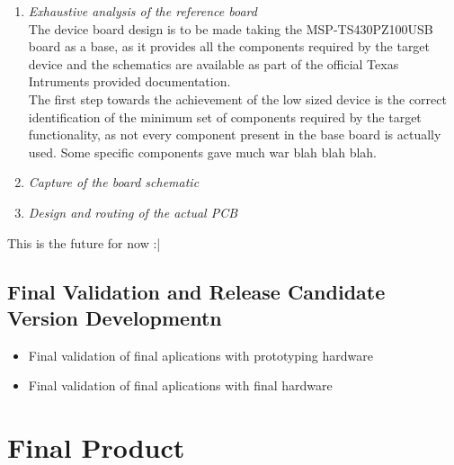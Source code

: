 		\begin{enumerate}
		\item \emph{Exhaustive analysis of the reference board}\\

			The device board design is to be made taking the MSP-TS430PZ100USB board as a base, as it provides all the components required by the target device and the schematics are available as part of the official Texas Intruments provided documentation.\\

			The first step towards the achievement of the low sized device is the correct identification of the minimum set of components required by the target functionality, as not every component present in the base board is actually used. Some specific components gave much war blah blah blah.

		\item \emph{Capture of the board schematic}\\
		\item \emph{Design and routing of the actual PCB}
		\end{enumerate}

		This is the future for now :|

		\subsection{Final Validation and Release Candidate Version Developmentn}
		\label{ssec:Final.Validation}	
		\begin{itemize}
		\item Final validation of final aplications with prototyping hardware
		\item Final validation of final aplications with final hardware
		\end{itemize}
		

		\section{Final Product}
		
